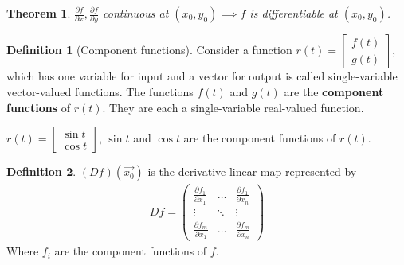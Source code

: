 \documentclass[12pt]{book}
\newtheorem{theorem}{Theorem}[section]
\theoremstyle{definition}
\newtheorem{definition}{Definition}[section]
\theoremstyle{remark}
\begin{document}
    \begin{theorem} \label{}
      $ \frac{\partial f }{\partial x},  \frac{\partial f }{\partial y} $ continuous at $(x_0, y_0) \implies f$ is differentiable at $(x_0, y_0)$.
    \end{theorem}
    \begin{definition}[Component functions] 
      Consider a function $r(t) = \begin{bmatrix} f(t)\\ g(t) \end{bmatrix}$, which has one variable for input and a vector for output is called single-variable vector-valued functions. The functions $f (t)$ and $g(t)$ are the \textbf{component functions} of $r(t)$. They are each a single-variable real-valued function.      
    \end{definition}
    \begin{example}
      $r(t) = \begin{bmatrix} \sin t \\ \cos t\end{bmatrix}$, $\sin t$ and $\cos t$ are the component functions of $r(t)$. 
    \end{example}
    \begin{definition}
      $(Df) (\vec{{x_0}})$ is the derivative linear map represented by 
      \begin{equation*}
        \begin{split}
          Df = \begin{pmatrix} \frac{\partial f_1}{\partial x_1} &\hdots &  \frac{\partial f_1}{\partial x_n} \\ 
            \vdots & \ddots &\vdots \\ 
            \frac{\partial f_m}{\partial x_1} & \hdots &  \frac{\partial f_m}{\partial x_n}  
          \end{pmatrix}
        \end{split}
      \end{equation*}
      Where $f_i$ are the component functions of $f$. 
      
    \end{definition}
\end{document}

